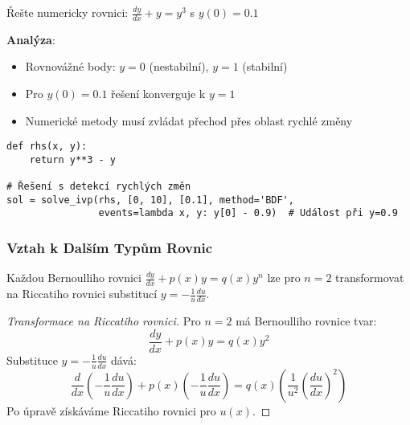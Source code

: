 \vspace{0.6\baselineskip}

\begin{example}
\label{ex:numericke-reseni-singularita}
Řešte numericky rovnici: $\frac{dy}{dx} + y = y^3$ s $y(0) = 0.1$

\textbf{Analýza}:
\begin{itemize}
\item Rovnovážné body: $y = 0$ (nestabilní), $y = 1$ (stabilní)
\item Pro $y(0) = 0.1$ řešení konverguje k $y = 1$
\item Numerické metody musí zvládat přechod přes oblast rychlé změny
\end{itemize}

\begin{verbatim}
def rhs(x, y):
    return y**3 - y

# Řešení s detekcí rychlých změn
sol = solve_ivp(rhs, [0, 10], [0.1], method='BDF',
                events=lambda x, y: y[0] - 0.9)  # Událost při y=0.9
\end{verbatim}
\end{example}

\vspace{0.8\baselineskip}

\subsubsection{Vztah k Dalším Typům Rovnic}
\label{subsubsec:vztah-dalsi-rovnice}

\begin{theorem}
\label{th:spojitost-riccati}
Každou Bernoulliho rovnici $\frac{dy}{dx} + p(x)y = q(x)y^n$ lze pro $n = 2$ transformovat na Riccatiho rovnici substitucí $y = -\frac{1}{u}\frac{du}{dx}$.
\end{theorem}

\vspace{0.6\baselineskip}

\begin{proof}[Transformace na Riccatiho rovnici]
Pro $n = 2$ má Bernoulliho rovnice tvar:
\[
\frac{dy}{dx} + p(x)y = q(x)y^2
\]
Substituce $y = -\frac{1}{u}\frac{du}{dx}$ dává:
\[
\frac{d}{dx}\left(-\frac{1}{u}\frac{du}{dx}\right) + p(x)\left(-\frac{1}{u}\frac{du}{dx}\right) = q(x)\left(\frac{1}{u^2}\left(\frac{du}{dx}\right)^2\right)
\]
Po úpravě získáváme Riccatiho rovnici pro $u(x)$.
\end{proof}

